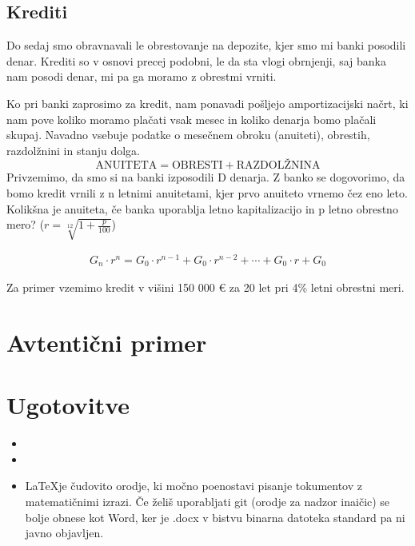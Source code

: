 \documentclass[12pt]{article}
\begin{document}
    \subsection{Krediti}
    Do sedaj smo obravnavali le obrestovanje na depozite, kjer smo mi banki posodili denar.
    Krediti so v osnovi precej podobni, le da sta vlogi obrnjenji, saj banka nam posodi
    denar, mi pa ga moramo z obrestmi vrniti.

    Ko pri banki zaprosimo za kredit, nam ponavadi pošljejo amportizacijski načrt, ki nam
    pove koliko moramo plačati vsak mesec in koliko denarja bomo plačali skupaj. Navadno
    vsebuje podatke o mesečnem obroku (anuiteti), obrestih, razdolžnini in 
    stanju dolga. 
    $$\text{ANUITETA} = \text{OBRESTI} + \text{RAZDOLŽNINA}$$
    Privzemimo, da smo si na banki izposodili D denarja. Z banko se dogovorimo, da bomo
    kredit vrnili z n letnimi anuitetami, kjer prvo anuiteto vrnemo čez eno leto. Kolikšna
    je anuiteta, če banka uporablja letno kapitalizacijo in p letno obrestno mero?
    ($r = \sqrt[12]{1 + \frac{p}{100}}$)

    \begin{equation}
        \begin{split}
            G_n \cdot r^n = G_0 \cdot r^{n - 1} + G_0 \cdot r^{n - 2} + \cdots + G_0 \cdot r + G_0
        \end{split}
    \end{equation}

    Za primer vzemimo kredit v višini 150 000 € za 20 let pri 4\% letni obrestni meri.

\section{Avtentični primer}
    



\section{Ugotovitve}
\begin{itemize}
    \item \quad
    \item \quad
    \item \LaTeX je čudovito orodje, ki močno poenostavi pisanje tokumentov z matematičnimi
    izrazi. Če želiš uporabljati git (orodje za nadzor inaičic) se bolje obnese kot Word,
    ker je .docx v bistvu binarna datoteka standard pa ni javno objavljen.
\end{itemize}
\end{document}
